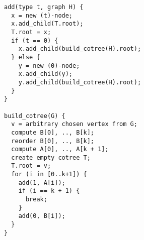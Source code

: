 \begin{verbatim}
add(type t, graph H) {
  x = new (t)-node;
  x.add_child(T.root);
  T.root = x;
  if (t == 0) {
    x.add_child(build_cotree(H).root);
  } else {
    y = new (0)-node;
    x.add_child(y);
    y.add_child(build_cotree(H).root);
  }
}

build_cotree(G) {
  v = arbitrary chosen vertex from G;
  compute B[0], .., B[k];
  reorder B[0], .., B[k];
  compute A[0], .., A[k + 1];
  create empty cotree T;
  T.root = v;
  for (i in [0..k+1]) {
    add(1, A[i]);
    if (i == k + 1) {
      break;
    }
    add(0, B[i]);
  }
}
\end{verbatim}